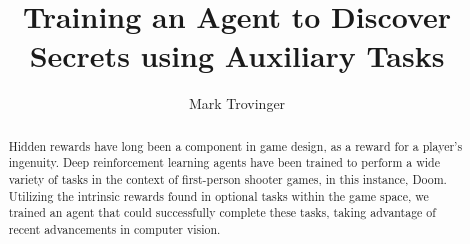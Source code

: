 \documentclass[11pt]{article}
\title{Training an Agent to Discover Secrets using Auxiliary Tasks}
\author{Mark Trovinger}
\begin{document}
	\maketitle
\begin{abstract}
	Hidden rewards have long been a component in game design, as a reward for a player's ingenuity. Deep reinforcement learning agents have been trained to perform a wide variety of tasks in the context of first-person shooter games, in this instance, Doom. Utilizing the intrinsic rewards found in optional tasks within the game space, we trained an agent that could successfully complete these tasks, taking advantage of recent advancements in computer vision.
	
\end{abstract}
\end{document}
